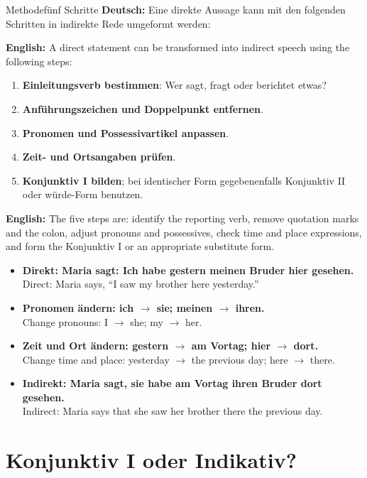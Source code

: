 \documentclass[a4paper,11pt]{article}
\newcommand{\GermanText}[1]{\textbf{Deutsch: }#1\par}
\newcommand{\EnglishText}[1]{{\small\color{SoftGray}\textbf{English: }#1\par}}
\newcommand{\ExampleItem}[2]{\item \textbf{#1}\\{\small\color{SoftGray}#2}}
\begin{document}
        \begin{grammarentry}{Methode}{fünf Schritte}
            \GermanText{Eine direkte Aussage kann mit den folgenden Schritten in indirekte Rede umgeformt werden:}
            \EnglishText{A direct statement can be transformed into indirect speech using the following steps:}

            \begin{enumerate}
                \item \textbf{Einleitungsverb bestimmen}: Wer sagt, fragt oder berichtet etwas?
                \item \textbf{Anführungszeichen und Doppelpunkt entfernen}.
                \item \textbf{Pronomen und Possessivartikel anpassen}.
                \item \textbf{Zeit- und Ortsangaben prüfen}.
                \item \textbf{Konjunktiv I bilden}; bei identischer Form gegebenenfalls Konjunktiv II oder würde-Form benutzen.
            \end{enumerate}

            \EnglishText{The five steps are: identify the reporting verb, remove quotation marks and the colon, adjust pronouns and possessives, check time and place expressions, and form the Konjunktiv I or an appropriate substitute form.}
        \end{grammarentry}

        \begin{exbox}
            \begin{itemize}
                \ExampleItem{Direkt: Maria sagt: \glqq Ich habe gestern meinen Bruder hier gesehen.\grqq}{Direct: Maria says, ``I saw my brother here yesterday.''}
                \ExampleItem{Pronomen ändern: ich $\rightarrow$ sie; meinen $\rightarrow$ ihren.}{Change pronouns: I $\rightarrow$ she; my $\rightarrow$ her.}
                \ExampleItem{Zeit und Ort ändern: gestern $\rightarrow$ am Vortag; hier $\rightarrow$ dort.}{Change time and place: yesterday $\rightarrow$ the previous day; here $\rightarrow$ there.}
                \ExampleItem{Indirekt: Maria sagt, sie habe am Vortag ihren Bruder dort gesehen.}{Indirect: Maria says that she saw her brother there the previous day.}
            \end{itemize}
        \end{exbox}


    \section{Konjunktiv I oder Indikativ?}
\end{document}
